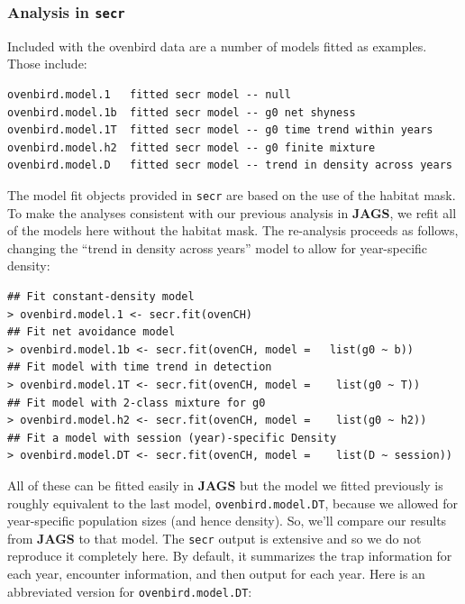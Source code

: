 \subsubsection{Analysis in \mbox{\tt secr} }

Included with the ovenbird data are a number of  models fitted as
examples. Those include:
{\small
\begin{verbatim}
ovenbird.model.1   fitted secr model -- null
ovenbird.model.1b  fitted secr model -- g0 net shyness
ovenbird.model.1T  fitted secr model -- g0 time trend within years
ovenbird.model.h2  fitted secr model -- g0 finite mixture
ovenbird.model.D   fitted secr model -- trend in density across years
\end{verbatim}
}
The model fit objects provided in \mbox{\tt secr} are based on the use
of the habitat mask.
To make the analyses consistent with our previous analysis in {\bf
  JAGS}, we 
refit all of the models here without the habitat mask.
The re-analysis proceeds as follows, changing the ``trend in density
across years'' model to allow for year-specific density:
{\small
\begin{verbatim}
## Fit constant-density model
> ovenbird.model.1 <- secr.fit(ovenCH)
## Fit net avoidance model
> ovenbird.model.1b <- secr.fit(ovenCH, model =   list(g0 ~ b))
## Fit model with time trend in detection
> ovenbird.model.1T <- secr.fit(ovenCH, model =    list(g0 ~ T))
## Fit model with 2-class mixture for g0
> ovenbird.model.h2 <- secr.fit(ovenCH, model =    list(g0 ~ h2))
## Fit a model with session (year)-specific Density
> ovenbird.model.DT <- secr.fit(ovenCH, model =    list(D ~ session))
\end{verbatim}
}
All of these can be fitted easily in {\bf JAGS} but
the model we fitted previously is roughly equivalent to the last model,
\mbox{\tt ovenbird.model.DT}, because we allowed for year-specific
population sizes (and hence density). So, we'll
compare our results from {\bf JAGS} to that
model.  
The \mbox{\tt secr} 
output is extensive 
and so we
do not reproduce it completely here. By default, it summarizes the
trap information for each year, encounter information, and then output for
each year. Here is an abbreviated version for \mbox{\tt ovenbird.model.DT}:
